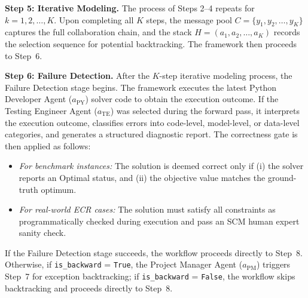 \documentclass[preprint,12pt]{elsarticle}
\begin{document}
\medskip
\noindent\textbf{Step 5: Iterative Modeling.}
The process of Steps 2--4 repeats for $k=1,2,\ldots,K$. Upon completing all $K$ steps, the message pool $C=\{y_1,y_2,\ldots,y_K\}$ captures the full collaboration chain, and the stack $H=(a_1,a_2,\ldots,a_K)$ records the selection sequence for potential backtracking. The framework then proceeds to Step~6.

\medskip
\noindent\textbf{Step 6: Failure Detection.}
After the $K$-step iterative modeling process, the Failure Detection stage begins. The framework executes the latest Python Developer Agent ($a_{\text{PY}}$) solver code to obtain the execution outcome. If the Testing Engineer Agent ($a_{\text{TE}}$) was selected during the forward pass, it interprets the execution outcome, classifies errors into code-level, model-level, or data-level categories, and generates a structured diagnostic report. The correctness gate is then applied as follows:
\begin{itemize}
 \item \textit{For benchmark instances:} The solution is deemed correct only if (i) the solver reports an Optimal status, and (ii) the objective value matches the ground-truth optimum.
 \item \textit{For real-world ECR cases:} The solution must satisfy all constraints as programmatically checked during execution and pass an SCM human expert sanity check.
\end{itemize}
If the Failure Detection stage succeeds, the workflow proceeds directly to Step~8. Otherwise, if \texttt{is\_backward} = \texttt{True}, the Project Manager Agent ($a_{\text{PM}}$) triggers Step~7 for exception backtracking; if \texttt{is\_backward} = \texttt{False}, the workflow skips backtracking and proceeds directly to Step~8.
\end{document}
